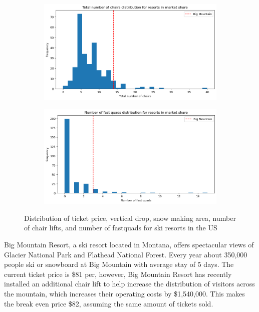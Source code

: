 \documentclass[14pt,a4paper]{extarticle}
\begin{document}
\begin{figure}
		\begin{subfigure}{0.47\textwidth}
			\includegraphics[width=\textwidth]{chairs}
			\caption{}
		\end{subfigure}
		\quad
		\begin{subfigure}{0.47\textwidth}
			\includegraphics[width=\textwidth]{fastquads}
			\caption{}
		\end{subfigure}
		\caption{Distribution of ticket price, vertical drop, snow making area, number of chair lifts, and number of fastquads for ski resorts in the US}
		\label{fig1}
	\end{figure}
	Big Mountain Resort, a ski resort located in Montana, offers spectacular views of Glacier National Park and Flathead National Forest. Every year about 350,000 people ski or snowboard at Big Mountain with average stay of 5 days. The current ticket price is \$81 per, however, Big Mountain Resort has recently installed an additional chair lift to help increase the distribution of visitors across the mountain, which increases their operating costs by \$1,540,000. This makes the break even price \$82, assuming the same amount of tickets sold.
	
\end{document}
